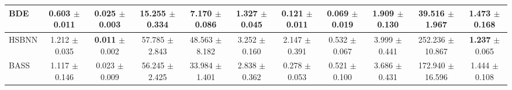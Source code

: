 \begin{table}[t]
{\begin{tabular}{lcccccccccc}
\shortstack[l]{BDE \\ {}} & \shortstack{\textbf{0.603} \\ $\pm$ 0.011} & \shortstack{0.025 \\ $\pm$ 0.003} & \shortstack{\textbf{15.255} \\ $\pm$ 0.334} & \shortstack{\textbf{7.170} \\ $\pm$ 0.086} & \shortstack{\textbf{1.327} \\ $\pm$ 0.045} & \shortstack{\textbf{0.121} \\ $\pm$ 0.011} & \shortstack{\textbf{0.069} \\ $\pm$ 0.019} & \shortstack{\textbf{1.909} \\ $\pm$ 0.130} & \shortstack{\textbf{39.516} \\ $\pm$ 1.967} & \shortstack{1.473 \\ $\pm$ 0.168} \\
\midrule
\shortstack[l]{HSBNN \\ {}} & \shortstack{1.212 \\ $\pm$ 0.035} & \shortstack{\textbf{0.011} \\ $\pm$ 0.002} & \shortstack{57.785 \\ $\pm$ 2.843} & \shortstack{48.563 \\ $\pm$ 8.182} & \shortstack{3.252 \\ $\pm$ 0.160} & \shortstack{2.147 \\ $\pm$ 0.391} & \shortstack{0.532 \\ $\pm$ 0.067} & \shortstack{3.999 \\ $\pm$ 0.441} & \shortstack{252.236 \\ $\pm$ 10.867} & \shortstack{\textbf{1.237} \\ $\pm$ 0.065} \\
\midrule
\shortstack[l]{BASS \\ {}} & \shortstack{1.117 \\ $\pm$ 0.146} & \shortstack{0.023 \\ $\pm$ 0.009} & \shortstack{56.245 \\ $\pm$ 2.425} & \shortstack{33.984 \\ $\pm$ 1.401} & \shortstack{2.838 \\ $\pm$ 0.362} & \shortstack{0.278 \\ $\pm$ 0.053} & \shortstack{0.521 \\ $\pm$ 0.100} & \shortstack{3.686 \\ $\pm$ 0.431} & \shortstack{172.940 \\ $\pm$ 16.596} & \shortstack{1.444 \\ $\pm$ 0.108} \\

\end{tabular}}
\end{table}
